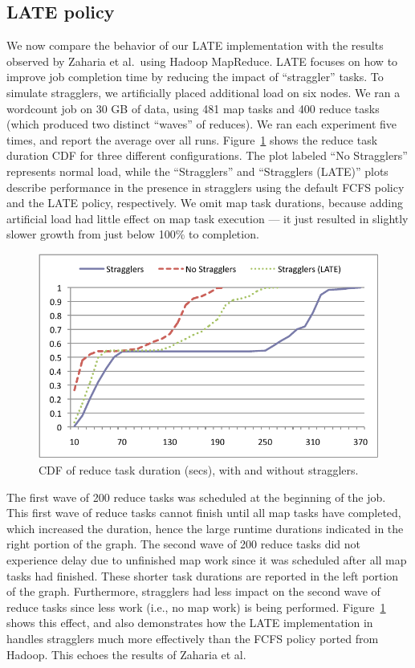 \subsection{LATE policy}

We now compare the behavior of our LATE implementation with the results observed
by Zaharia et al.\ using Hadoop MapReduce. LATE focuses on how to improve job completion time by reducing the impact of
``straggler'' tasks. To simulate stragglers, we artificially placed additional
load on six nodes. We ran a wordcount job on 30 GB of data, using 481 map tasks
and 400 reduce tasks (which produced two distinct ``waves'' of reduces). We ran
each experiment five times, and report the average over all
runs. Figure~\ref{fig:ec2reduce} shows the reduce task duration CDF for three
different configurations. The plot labeled ``No Stragglers'' represents normal
load, while the ``Stragglers'' and ``Stragglers (LATE)'' plots describe
performance in the presence in stragglers using the default FCFS policy and the
LATE policy, respectively. We omit map task durations, because adding artificial
load had little effect on map task execution --- it just resulted in slightly
slower growth from just below 100\% to completion.

\begin{figure}
\ssp
  \centering
  \includegraphics[scale=0.75]{figures/reduce_stragglers}
  \caption{CDF of reduce task duration (secs), with and without stragglers.}
  \label{fig:ec2reduce}
\end{figure}

The first wave of 200 reduce tasks was scheduled at the beginning of the
job. This first wave of reduce tasks cannot finish until all map tasks have
completed, which increased the duration, hence the large runtime durations indicated in the right
portion of the graph. The second wave of 200 reduce tasks did not experience
delay due to unfinished map work since it was scheduled after all map tasks had
finished. These shorter task durations are reported in the left portion of the
graph. Furthermore, stragglers had less impact on the second wave of reduce
tasks since less work (i.e., no map work) is being performed. Figure~\ref{fig:ec2reduce} 
shows this effect, and also demonstrates how the LATE implementation in {\BOOMA} 
handles stragglers much more effectively than the FCFS policy ported from Hadoop.  
This echoes the results of Zaharia et al.~\cite{zaharia-late}

